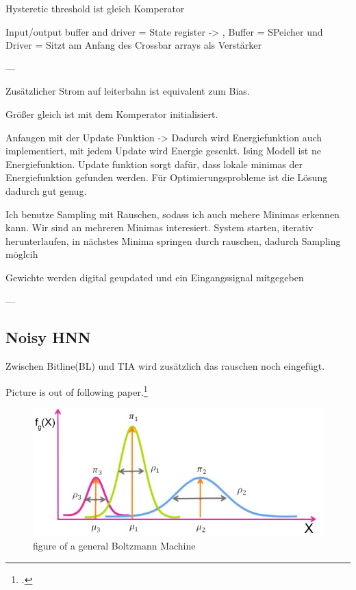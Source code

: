 Hysteretic threshold ist gleich Komperator 

Input/output buffer and driver = State register -> , Buffer = SPeicher und Driver = Sitzt am Anfang des Crossbar arrays als Verstärker 

---

Zusätzlicher Strom auf leiterbahn ist equivalent zum Bias. 

Größer gleich ist mit dem Komperator initialisiert. 

Anfangen mit der Update Funktion -> Dadurch wird Energiefunktion auch implementiert, mit jedem Update wird Energie gesenkt.
Ising Modell ist ne Energiefunktion. Update funktion sorgt dafür, dass lokale minimas der Energiefunktion gefunden werden. 
Für Optimierungsprobleme ist die Lösung dadurch gut genug. 

Ich benutze Sampling mit Rauschen, sodass ich auch mehere Minimas erkennen kann. Wir sind an mehreren Minimas interesiert. 
System starten, iterativ herunterlaufen, in nächstes Minima springen durch rauschen, dadurch Sampling möglcih 

Gewichte werden digital geupdated und ein Eingangssignal mitgegeben 

---


\subsection{Noisy HNN}

Zwischen Bitline(BL) und TIA wird zusätzlich das rauschen noch eingefügt. 


Picture is out of following paper.\footcite[cf.][3]{gmComprehensiveSurveyAnalysis2020}
\begin{figure}[H]
    \centering
    \includegraphics[width=0.7\linewidth]{graphics/Gaussian_Normal_Distribution_edited.jpg}
    \caption{figure of a general Boltzmann Machine}
    \label{fig2}
\end{figure}
